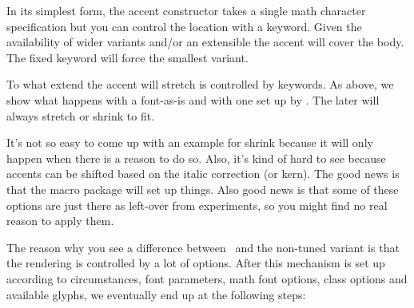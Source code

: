 \startbuffer[5]
\stopbuffer

In its simplest form, the accent constructor takes a single math character
specification but you can control the location with a keyword. Given the
availability of wider variants and/or an extensible the accent will cover the
body. The fixed keyword will force the smallest variant.

\typebuffer[1][option=TEX]

\start \switchtobodyfont[pagella-nt] \getbuffer[1] \par \stop
\start \switchtobodyfont[pagella]    \getbuffer[1] \par \stop

To what extend the accent will stretch is controlled by keywords. As above, we
show what happens with a font-as-is and with one set up by \CONTEXT. The later
will always stretch or shrink to fit.

\typebuffer[21][option=TEX]

\start \switchtobodyfont[pagella-nt] \getbuffer[2] \par \stop
\start \switchtobodyfont[pagella]    \getbuffer[2] \par \stop

It's not so easy to come up with an example for shrink because it will only
happen when there is a reason to do so. Also, it's kind of hard to see because
accents can be shifted based on the italic correction (or kern). The good news is
that the macro package will set up things. Also good news is that some of these
options are just there as left-over from experiments, so you might find no real
reason to apply them.

\typebuffer[22][option=TEX]

\start \switchtobodyfont[pagella-nt] \getbuffer[2] \par \stop
\start \switchtobodyfont[pagella]    \getbuffer[2] \par \stop

The reason why you see a difference between \CONTEXT\ and the non-tuned variant
is that the rendering is controlled by a lot of options. After this mechanism is
set up according to circumstances, font parameters, math font options, class
options and available glyphs, we eventually end up at the following steps:

